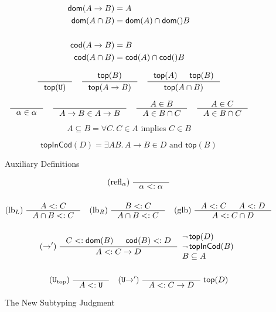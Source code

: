 \documentclass{article}
\begin{document}
\begin{figure}[tbp]

  \begin{align*}
  \dom{A \to B} &= A \\
  \dom{A \cap B} &= \dom{A} \cap \dom {B} \\
  \\
  \cod{A \to B} &= B \\
  \cod{A \cap B} &= \cod{A} \cap \cod {B}
  \end{align*}

  \begin{gather*}
    \inference{}{\topP{\TOP}}
    \quad
    \inference{\topP{B}}{\topP{A \to B}}
    \quad
    \inference{\topP{A} & \topP{B}}{\topP{A \cap B}}
  \end{gather*}

  \begin{gather*}
    \inference{}{\alpha \in \alpha}  \quad
    \inference{}{A \to B \in A \to B} \quad
    \inference{A \in B}{A \in B \cap C} \quad
    \inference{A \in C}{A \in B \cap C}
  \end{gather*}

  \[
     A \subseteq B = ∀ C.\, C \in A \text{ implies } C \in B
  \]

  \[
  \mathsf{topInCod}(D) =
     \exists A B.\, A \to B \in D \text{ and } \mathsf{top}(B)  
  \]

  \caption{Auxiliary Definitions}
  \label{fig:aux}
\end{figure}


\begin{figure}[tbp]
  \begin{gather*}
    \text{(refl$_\alpha$)} \; \inference{}{\alpha <: \alpha} \\[3ex]
    \text{(lb$_L$)} \; \inference{A <: C}{A \cap B <: C} \quad
    \text{(lb$_R$)} \; \inference{B <: C}{A \cap B <: C} \quad
    \text{(glb)} \; \inference{A <: C & A <: D}{A <: C \cap D} \\[3ex]
    (\to') \; \inference{C <: \dom{B} & \cod{B} <: D }{A <: C \to D}
    \begin{array}{l} \neg\, \mathsf{top}(D) \\
      \neg \, \mathsf{topInCod}(B) \\
      B \subseteq A \end{array}\\[3ex]
    (\TOP_{\mathrm{top}}) \; \inference{}{A <: \TOP} \quad
    (\TOP{\to}') \; \inference{}{A <: C \to D}\;\mathsf{top}(D)
  \end{gather*}
  \caption{The New Subtyping Judgment}
  \label{fig:new-subtyping}
\end{figure}
\end{document}
